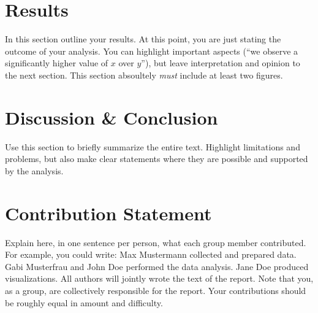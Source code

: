\documentclass{article}
\begin{document}
% 

\section{Results}\label{sec:results}

In this section outline your results. At this point, you are just stating the outcome of your analysis. You can highlight important aspects (``we observe a significantly higher value of $x$ over $y$''), but leave interpretation and opinion to the next section. This section absoultely \emph{must} include at least two figures.

\section{Discussion \& Conclusion}\label{sec:conclusion}

Use this section to briefly summarize the entire text. Highlight limitations and problems, but also make clear statements where they are possible and supported by the analysis. 

\newpage

\section*{Contribution Statement}
Explain here, in one sentence per person, what each group member contributed. For example, you could write: Max Mustermann collected and prepared data. Gabi Musterfrau and John Doe performed the data analysis. Jane Doe produced visualizations. All authors will jointly wrote the text of the report. Note that you, as a group, are collectively responsible for the report. Your contributions should be roughly equal in amount and difficulty.
\end{document}
